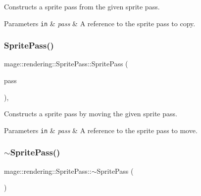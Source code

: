 Constructs a sprite pass from the given sprite pass.


\begin{DoxyParams}[1]{Parameters}
\mbox{\tt in}  & {\em pass} & A reference to the sprite pass to copy. \\
\hline
\end{DoxyParams}
\mbox{\label{classmage_1_1rendering_1_1_sprite_pass_ae8b938a091647c5540fa2ca8bf955556}} 
\subsubsection{\texorpdfstring{Sprite\+Pass()}{SpritePass()}\hspace{0.1cm}{\footnotesize\ttfamily [3/3]}}
{\footnotesize\ttfamily mage\+::rendering\+::\+Sprite\+Pass\+::\+Sprite\+Pass (\begin{DoxyParamCaption}\item[{\mbox{\hyperlink{classmage_1_1rendering_1_1_sprite_pass}{Sprite\+Pass}} \&\&}]{pass }\end{DoxyParamCaption})\hspace{0.3cm}{\ttfamily [default]}, {\ttfamily [noexcept]}}

Constructs a sprite pass by moving the given sprite pass.


\begin{DoxyParams}[1]{Parameters}
\mbox{\tt in}  & {\em pass} & A reference to the sprite pass to move. \\
\hline
\end{DoxyParams}
\mbox{\label{classmage_1_1rendering_1_1_sprite_pass_ac838dec1c351d3d4f0fdcc38ef98dc1f}} 
\subsubsection{\texorpdfstring{$\sim$\+Sprite\+Pass()}{~SpritePass()}}
{\footnotesize\ttfamily mage\+::rendering\+::\+Sprite\+Pass\+::$\sim$\+Sprite\+Pass (\begin{DoxyParamCaption}{ }\end{DoxyParamCaption})\hspace{0.3cm}{\ttfamily [default]}}

